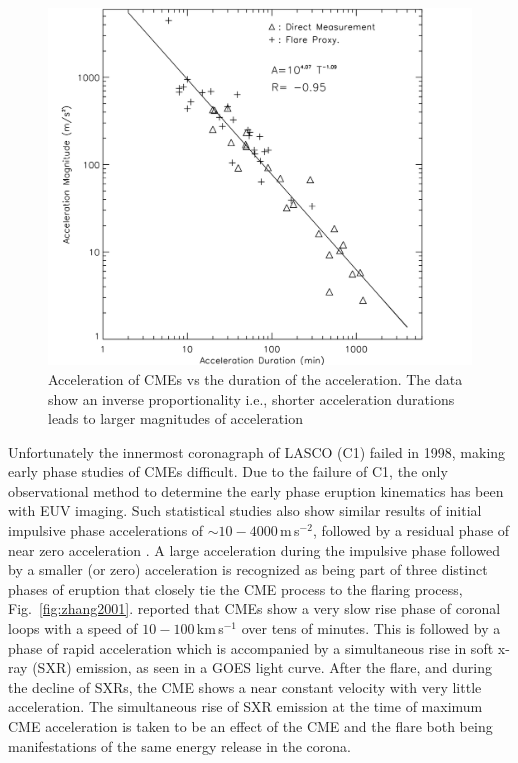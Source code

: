 \begin{figure}[t!]
\begin{center}
\includegraphics[scale=0.25]{images/accel_zhang2006}
\caption[CME acceleration as a function of acceleration duration]{Acceleration of CMEs vs the duration of the acceleration. The data show an inverse proportionality i.e., shorter acceleration durations leads to larger magnitudes of acceleration \citep{zhang2006}}
\label{fig:acell_duration}
\end{center}
\end{figure}
Unfortunately the innermost coronagraph of LASCO (C1) failed in 1998, making early phase studies of CMEs difficult. Due to the failure of C1, the only observational method to determine the early phase eruption kinematics has been with EUV imaging.
Such statistical studies also show similar results of initial impulsive phase accelerations of $\sim10-4000$\,m\,s$^{-2}$, followed by a residual phase of near zero acceleration \citep{vrsnak2007, temmer2010}. A large acceleration during the impulsive phase followed by a smaller (or zero) acceleration is recognized as being part of three distinct phases of eruption that closely tie the CME process to the flaring process, Fig.~\ref{fig:zhang2001}. \citet{zhang2001, zhang2004} reported that CMEs show a very slow rise phase of coronal loops with a speed of $10-100$\,km\,s$^{-1}$ over tens of minutes. This is followed by a phase of rapid acceleration which is accompanied by a simultaneous rise in soft x-ray (SXR) emission, as seen in a GOES light curve. After the flare, and during the decline of SXRs, the CME shows a near constant velocity with very little acceleration. The simultaneous rise of SXR emission at the time of maximum CME acceleration is taken to be an effect of the CME and the flare both being manifestations of the same energy release in the corona.

